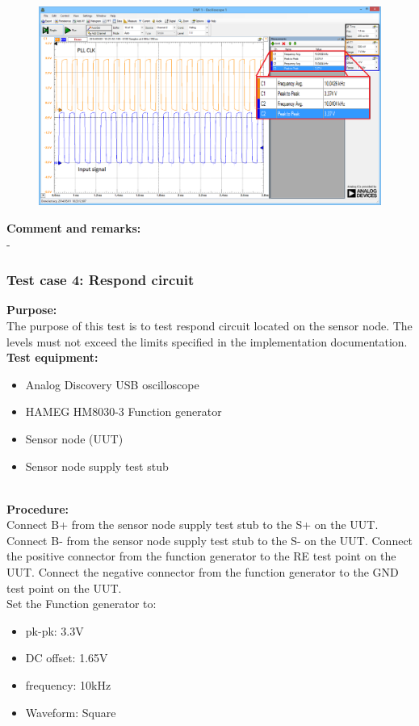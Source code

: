 \begin{figure}[H]
	\centering
	\includegraphics[width=.9\textwidth]{billeder/SN_Case_3_osc_picture}
\end{figure}
\textbf{Comment and remarks:}\\
-\\

\subsubsection{Test case 4: Respond circuit}
\textbf{Purpose:}\\
The purpose of this test is to test respond circuit located on the sensor node. The levels must not exceed the limits specified in the implementation documentation.\\

\textbf{Test equipment:}
\begin{itemize}
	\item Analog Discovery USB oscilloscope
	\item HAMEG HM8030-3 Function generator
	\item Sensor node (UUT)
	\item Sensor node supply test stub
\end{itemize}
\ \\
\textbf{Procedure:}\\
Connect B+ from the sensor node supply test stub to the S+ on the UUT. Connect B- from the sensor node supply test stub to the S- on the UUT.
Connect the positive connector from the function generator to the RE test point on the UUT. Connect the negative connector from the function generator to the GND test point on the UUT.\\ Set the Function generator to:
\begin{itemize}
	\item pk-pk: 3.3V
	\item DC offset: 1.65V
	\item frequency: 10kHz
	\item Waveform: Square
\end{itemize}

